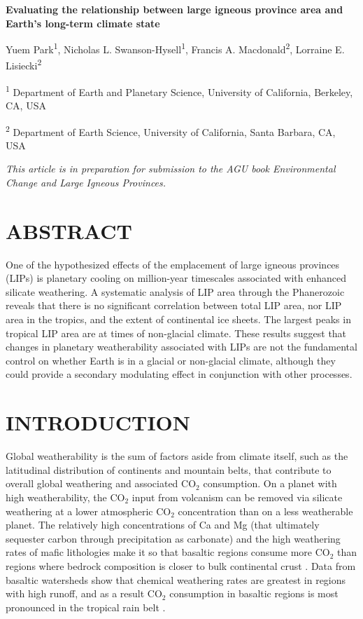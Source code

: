 \documentclass[11pt,letterpaper]{article}
\begin{document}
\begin{flushleft}
{\Large \textbf{Evaluating the relationship between large igneous province area and Earth's long-term climate state}}

Yuem Park\textsuperscript{1},
Nicholas L. Swanson-Hysell\textsuperscript{1},
Francis A. Macdonald\textsuperscript{2},
Lorraine E. Lisiecki\textsuperscript{2}

\bigskip
\textsuperscript{1} Department of Earth and Planetary Science, University of California, Berkeley, CA, USA

\textsuperscript{2} Department of Earth Science, University of California, Santa Barbara, CA, USA
\bigskip

\end{flushleft}

\noindent\textit{This article is in preparation for submission to the AGU book \textit{Environmental Change and Large Igneous Provinces}.}

\linenumbers

\section*{ABSTRACT \label{sec:ABSTRACT}}

One of the hypothesized effects of the emplacement of large igneous provinces (LIPs) is planetary cooling on million-year timescales associated with enhanced silicate weathering. A systematic analysis of LIP area through the Phanerozoic reveals that there is no significant correlation between total LIP area, nor LIP area in the tropics, and the extent of continental ice sheets. The largest peaks in tropical LIP area are at times of non-glacial climate. These results suggest that changes in planetary weatherability associated with LIPs are not the fundamental control on whether Earth is in a glacial or non-glacial climate, although they could provide a secondary modulating effect in conjunction with other processes.

\section*{INTRODUCTION \label{sec:INTRODUCTION}}

Global weatherability is the sum of factors aside from climate itself, such as the latitudinal distribution of continents and mountain belts, that contribute to overall global weathering and associated CO$_2$ consumption. On a planet with high weatherability, the CO$_2$ input from volcanism can be removed via silicate weathering at a lower atmospheric CO$_2$ concentration than on a less weatherable planet. The relatively high concentrations of Ca and Mg (that ultimately sequester carbon through precipitation as carbonate) and the high weathering rates of mafic lithologies make it so that basaltic regions consume more CO$_2$ than regions where bedrock composition is closer to bulk continental crust \citep{Dessert2003a}. Data from basaltic watersheds show that chemical weathering rates are greatest in regions with high runoff, and as a result CO$_2$ consumption in basaltic regions is most pronounced in the tropical rain belt \citep{Dessert2003a, Hartmann2009a, Hartmann2014a}.
\end{document}
